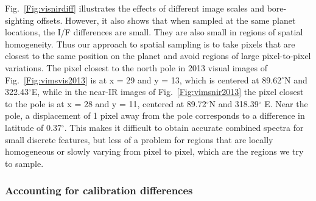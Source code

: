 \documentclass[article,11pt]{emulateapj}
\def\degx{$^\circ$}
\begin{document}
Fig.\ \ref{Fig:visnirdiff} illustrates the effects of different image
scales and bore-sighting offsets.  However, it also shows that when
sampled at the same planet locations, the I/F differences
are small.  They are also small in regions of spatial homogeneity.
Thus our approach to spatial sampling is to take pixels that are
closest to the same position on the planet and avoid regions of large
pixel-to-pixel variations.  The pixel closest to the north pole in
2013 visual images of Fig.\ \ref{Fig:vimsvis2013} is at x = 29 and y =
13, which is centered at 89.62\degx N and 322.43\degx E, while in the
near-IR images of Fig.\ \ref{Fig:vimsnir2013} the pixel closest to the
pole is at x = 28 and y = 11, centered at 89.72\degx N and 318.39\degx
E.  Near the pole, a displacement of 1 pixel away from the pole
corresponds to a difference in latitude of 0.37\degx.  This makes it
difficult to obtain accurate combined spectra for small discrete
features, but less of a problem for regions that are locally
homogeneous or slowly varying from pixel to pixel, which are the
regions we try to sample.


\subsubsection{Accounting for calibration differences}\label{Sec:caldiff}
\end{document}
